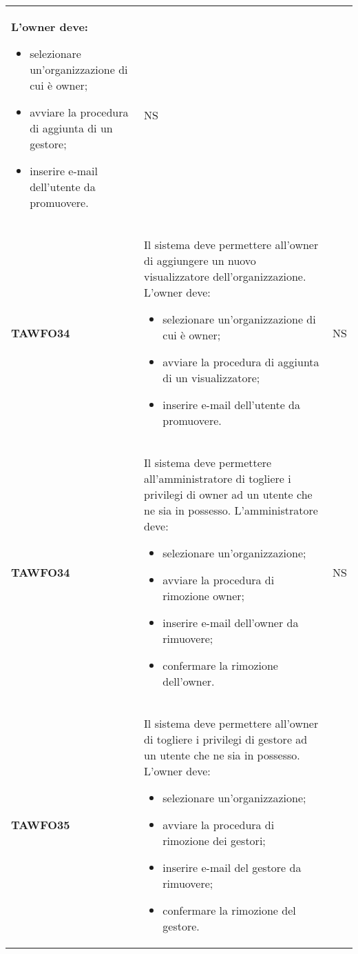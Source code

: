 \documentclass[../piano-di-qualifica.tex]{subfiles}
\begin{document}
\begin{centering}
\begin{longtable}[H]{>{\centering\bfseries}m{3cm} >{}p{10cm} >{\centering\arraybackslash}m{3cm}}
        L'owner deve:
        \begin{itemize}
         \item selezionare un'organizzazione di cui è owner;
         \item avviare la procedura di aggiunta di un gestore;
         \item inserire e-mail dell'utente da promuovere.
        \end{itemize}
        & NS \\
        TAWFO34      & Il sistema deve permettere all’owner di aggiungere un nuovo visualizzatore dell’organizzazione.    \newline
        L'owner deve:
        \begin{itemize}
         \item selezionare un'organizzazione di cui è owner;
         \item avviare la procedura di aggiunta di un visualizzatore;
         \item inserire e-mail dell'utente da promuovere.
        \end{itemize}
        & NS \\
        TAWFO34      & Il sistema deve permettere all’amministratore di togliere i privilegi di owner ad un utente che ne sia in possesso.    \newline
        L'amministratore deve:
        \begin{itemize}
         \item selezionare un'organizzazione;
         \item avviare la procedura di rimozione owner;
         \item inserire e-mail dell'owner da rimuovere;
         \item confermare la rimozione dell'owner.
        \end{itemize}
        & NS \\
        TAWFO35      & Il sistema deve permettere all’owner di togliere i privilegi di gestore ad un utente che ne sia in possesso. \newline
        L'owner deve:
        \begin{itemize}
         \item selezionare un'organizzazione;
         \item avviare la procedura di rimozione dei gestori;
         \item inserire e-mail del gestore da rimuovere;
         \item confermare la rimozione del gestore.

\end{itemize}
\end{longtable}
\end{centering}
\end{document}
